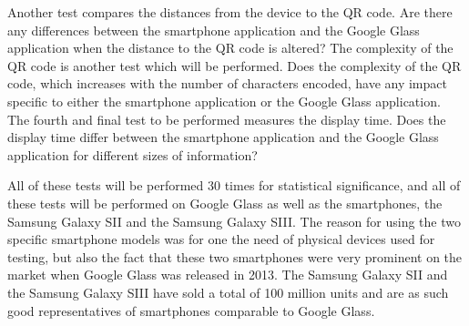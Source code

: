 Another test compares the distances from the device to the QR code. Are there any differences between the smartphone application and the Google Glass application when the distance to the QR code is altered? The complexity of the QR code is another test which will be performed. Does the complexity of the QR code, which increases with the number of characters encoded, have any impact specific to either the smartphone application or the Google Glass application. The fourth and final test to be performed measures the display time. Does the display time differ between the smartphone application and the Google Glass application for different sizes of information?

All of these tests will be performed 30 times for statistical significance, and all of these tests will be performed on Google Glass as well as the smartphones, the Samsung Galaxy SII and the Samsung Galaxy SIII. The reason for using the two specific smartphone models was for one the need of physical devices used for testing, but also the fact that these two smartphones were very prominent on the market when Google Glass was released in 2013. The Samsung Galaxy SII and the Samsung Galaxy SIII have sold a total of 100 million units and are as such good representatives of smartphones comparable to Google Glass.


